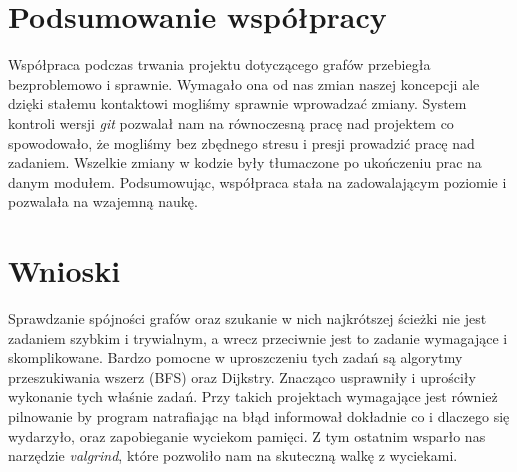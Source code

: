 \documentclass[10pt, a4paper]{report}
\begin{document}
    \section{Podsumowanie współpracy}
    Współpraca podczas trwania projektu dotyczącego grafów przebiegła bezproblemowo i sprawnie. Wymagało ona od nas zmian naszej koncepcji ale dzięki stałemu kontaktowi mogliśmy sprawnie wprowadzać zmiany.
    System kontroli wersji \textit{git} pozwalał nam na równoczesną pracę nad projektem co spowodowało, że mogliśmy bez zbędnego stresu i presji prowadzić pracę nad zadaniem.
    Wszelkie zmiany w kodzie były tłumaczone po ukończeniu prac na danym modułem. Podsumowując, współpraca stała na zadowalającym poziomie i pozwalała na wzajemną naukę.

    \section{Wnioski}
    Sprawdzanie spójności grafów oraz szukanie w nich najkrótszej ścieżki nie jest zadaniem szybkim i trywialnym, a wrecz przeciwnie jest to zadanie wymagające i skomplikowane.
    Bardzo pomocne w uproszczeniu tych zadań są algorytmy przeszukiwania wszerz (BFS) oraz Dijkstry. Znacząco usprawniły i uprościły wykonanie tych właśnie zadań.
    Przy takich projektach wymagające jest również pilnowanie by program natrafiając na błąd informował dokładnie co i dlaczego się wydarzyło, oraz zapobieganie wyciekom pamięci.
    Z tym ostatnim wsparło nas narzędzie \textit{valgrind}, które pozwoliło nam na skuteczną walkę z wyciekami.
\end{document}
